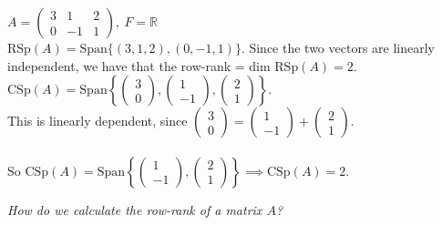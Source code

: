 \documentclass[10pt]{scrartcl}
\begin{document}
\begin{example}
$A = \begin{pmatrix}
 3 & 1 & 2\\
 0 & -1 & 1
 \end{pmatrix},~ F = \mathbb{R}$\\
 
 $\text{RSp}(A) = \text{Span}\{(3,1,2),(0,-1,1)\}$. Since the two vectors are linearly independent, we have that the row-rank = dim $\text{RSp}(A) = 2$.\\
 
 $\text{CSp}(A) = \text{Span}\left\{
 \begin{pmatrix}
 3\\0 
 \end{pmatrix}, 
 \begin{pmatrix}
 1 \\ -1
 \end{pmatrix},
 \begin{pmatrix}
 2\\1
 \end{pmatrix}
\right\}$. \\

This is linearly dependent, since $
\begin{pmatrix}
3\\0
\end{pmatrix}
= 
\begin{pmatrix}
1\\-1
\end{pmatrix}
+ \begin{pmatrix}
 2\\1
 \end{pmatrix}
$.\\~\\

So $\text{CSp}(A) = \text{Span}\left\{
\begin{pmatrix}
 1 \\ -1
 \end{pmatrix},
 \begin{pmatrix}
 2\\1
 \end{pmatrix}
\right\} \implies \text{CSp}(A) = 2.$
\end{example}



\textit{How do we calculate the row-rank of a matrix $A$?}\\
\end{document}

